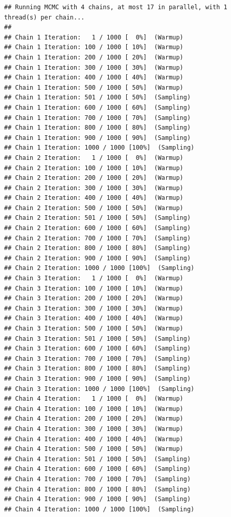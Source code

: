 \documentclass[
]{book}
\begin{document}
\begin{verbatim}
## Running MCMC with 4 chains, at most 17 in parallel, with 1 thread(s) per chain...
## 
## Chain 1 Iteration:   1 / 1000 [  0%]  (Warmup) 
## Chain 1 Iteration: 100 / 1000 [ 10%]  (Warmup) 
## Chain 1 Iteration: 200 / 1000 [ 20%]  (Warmup) 
## Chain 1 Iteration: 300 / 1000 [ 30%]  (Warmup) 
## Chain 1 Iteration: 400 / 1000 [ 40%]  (Warmup) 
## Chain 1 Iteration: 500 / 1000 [ 50%]  (Warmup) 
## Chain 1 Iteration: 501 / 1000 [ 50%]  (Sampling) 
## Chain 1 Iteration: 600 / 1000 [ 60%]  (Sampling) 
## Chain 1 Iteration: 700 / 1000 [ 70%]  (Sampling) 
## Chain 1 Iteration: 800 / 1000 [ 80%]  (Sampling) 
## Chain 1 Iteration: 900 / 1000 [ 90%]  (Sampling) 
## Chain 1 Iteration: 1000 / 1000 [100%]  (Sampling) 
## Chain 2 Iteration:   1 / 1000 [  0%]  (Warmup) 
## Chain 2 Iteration: 100 / 1000 [ 10%]  (Warmup) 
## Chain 2 Iteration: 200 / 1000 [ 20%]  (Warmup) 
## Chain 2 Iteration: 300 / 1000 [ 30%]  (Warmup) 
## Chain 2 Iteration: 400 / 1000 [ 40%]  (Warmup) 
## Chain 2 Iteration: 500 / 1000 [ 50%]  (Warmup) 
## Chain 2 Iteration: 501 / 1000 [ 50%]  (Sampling) 
## Chain 2 Iteration: 600 / 1000 [ 60%]  (Sampling) 
## Chain 2 Iteration: 700 / 1000 [ 70%]  (Sampling) 
## Chain 2 Iteration: 800 / 1000 [ 80%]  (Sampling) 
## Chain 2 Iteration: 900 / 1000 [ 90%]  (Sampling) 
## Chain 2 Iteration: 1000 / 1000 [100%]  (Sampling) 
## Chain 3 Iteration:   1 / 1000 [  0%]  (Warmup) 
## Chain 3 Iteration: 100 / 1000 [ 10%]  (Warmup) 
## Chain 3 Iteration: 200 / 1000 [ 20%]  (Warmup) 
## Chain 3 Iteration: 300 / 1000 [ 30%]  (Warmup) 
## Chain 3 Iteration: 400 / 1000 [ 40%]  (Warmup) 
## Chain 3 Iteration: 500 / 1000 [ 50%]  (Warmup) 
## Chain 3 Iteration: 501 / 1000 [ 50%]  (Sampling) 
## Chain 3 Iteration: 600 / 1000 [ 60%]  (Sampling) 
## Chain 3 Iteration: 700 / 1000 [ 70%]  (Sampling) 
## Chain 3 Iteration: 800 / 1000 [ 80%]  (Sampling) 
## Chain 3 Iteration: 900 / 1000 [ 90%]  (Sampling) 
## Chain 3 Iteration: 1000 / 1000 [100%]  (Sampling) 
## Chain 4 Iteration:   1 / 1000 [  0%]  (Warmup) 
## Chain 4 Iteration: 100 / 1000 [ 10%]  (Warmup) 
## Chain 4 Iteration: 200 / 1000 [ 20%]  (Warmup) 
## Chain 4 Iteration: 300 / 1000 [ 30%]  (Warmup) 
## Chain 4 Iteration: 400 / 1000 [ 40%]  (Warmup) 
## Chain 4 Iteration: 500 / 1000 [ 50%]  (Warmup) 
## Chain 4 Iteration: 501 / 1000 [ 50%]  (Sampling) 
## Chain 4 Iteration: 600 / 1000 [ 60%]  (Sampling) 
## Chain 4 Iteration: 700 / 1000 [ 70%]  (Sampling) 
## Chain 4 Iteration: 800 / 1000 [ 80%]  (Sampling) 
## Chain 4 Iteration: 900 / 1000 [ 90%]  (Sampling) 
## Chain 4 Iteration: 1000 / 1000 [100%]  (Sampling)
\end{verbatim}
\end{document}
